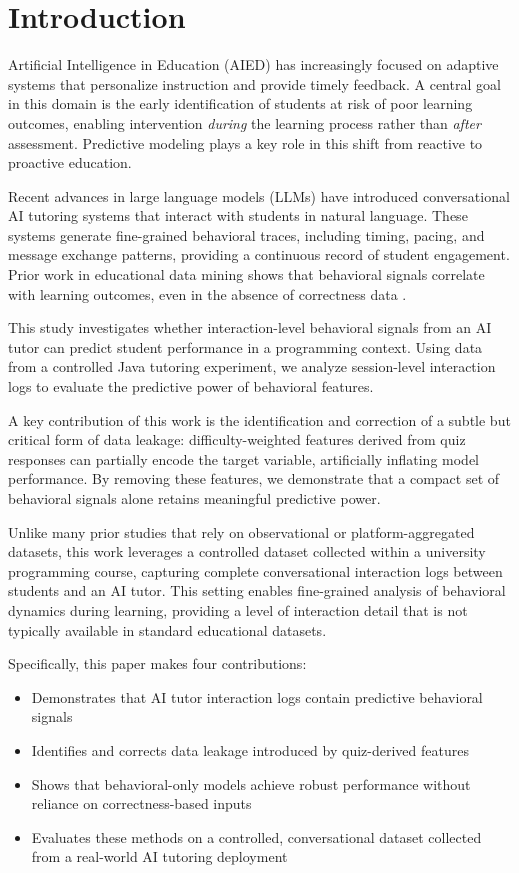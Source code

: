 \documentclass[conference]{IEEEtran}
\begin{document}
\section{Introduction}

Artificial Intelligence in Education (AIED) has increasingly focused on adaptive systems that personalize instruction and provide timely feedback. A central goal in this domain is the early identification of students at risk of poor learning outcomes, enabling intervention \textit{during} the learning process rather than \textit{after} assessment. Predictive modeling plays a key role in this shift from reactive to proactive education.

Recent advances in large language models (LLMs) have introduced conversational AI tutoring systems that interact with students in natural language. These systems generate fine-grained behavioral traces, including timing, pacing, and message exchange patterns, providing a continuous record of student engagement. Prior work in educational data mining shows that behavioral signals correlate with learning outcomes, even in the absence of correctness data \cite{encyclopedia4040108}.

This study investigates whether interaction-level behavioral signals from an AI tutor can predict student performance in a programming context. Using data from a controlled Java tutoring experiment, we analyze session-level interaction logs to evaluate the predictive power of behavioral features.

A key contribution of this work is the identification and correction of a subtle but critical form of data leakage: difficulty-weighted features derived from quiz responses can partially encode the target variable, artificially inflating model performance. By removing these features, we demonstrate that a compact set of behavioral signals alone retains meaningful predictive power.

Unlike many prior studies that rely on observational or platform-aggregated datasets, this work leverages a controlled dataset collected within a university programming course, capturing complete conversational interaction logs between students and an AI tutor. This setting enables fine-grained analysis of behavioral dynamics during learning, providing a level of interaction detail that is not typically available in standard educational datasets.

Specifically, this paper makes four contributions:

\begin{itemize}
    \item Demonstrates that AI tutor interaction logs contain predictive behavioral signals
    \item Identifies and corrects data leakage introduced by quiz-derived features
    \item Shows that behavioral-only models achieve robust performance without reliance on correctness-based inputs
    \item Evaluates these methods on a controlled, conversational dataset collected from a real-world AI tutoring deployment
\end{itemize}
\end{document}
